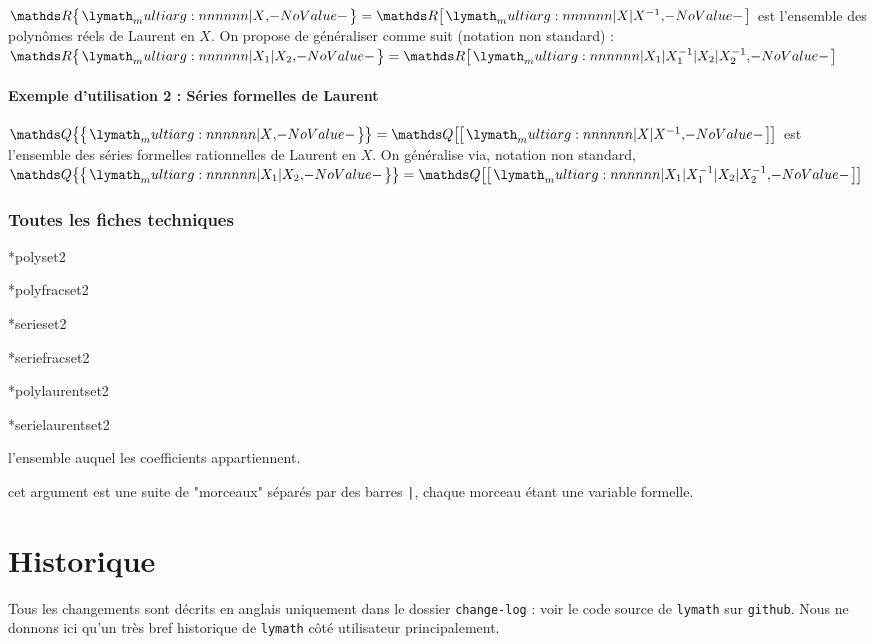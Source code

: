 \documentclass[12pt,a4paper]{article}
\makeatletter
\theoremstyle{definition}
\newcommand\IDmacro{\@ifstar{\@IDmacro@star}{\@IDmacro@no@star}}
\newcommand\@IDmacro@no@star[3]{%
    \texttt{%
    	\textbackslash#1%
    	\IfStrEq{#2}{0}{}{%
    		\,\,[#2 Option%
				\IfStrEq{#2}{1}{}{s}]%
			}%
	    \IfStrEq{#3}{}{}{%
	    		\,\,(#3 Argument%
				\IfStrEq{#3}{1}{}{s})%
			}
	   	}
    \immediate\write\tempfile{macro,#1,#2,#3}%
}
\newcommand\@IDmacro@star[2]{%
    \@IDmacro@no@star{#1}{0}{#2}%
}
\newcommand\@IDoptarg{\@ifstar{\@IDoptarg@star}{\@IDoptarg@no@star}}
\newcommand\@IDoptarg@star[2]{%
	\vspace{0.5em}
	\textbf{---} \texttt{#1%
		\IfStrEq{#2}{}{:}{\,#2:}%
	}%
}
\newcommand\@IDoptarg@no@star[2]{%
	\IfStrEq{#2}{}{%
		\@IDoptarg@star{#1}{}%
	}{%
		\@IDoptarg@star{#1}{#2}%
	}%
}
\newcommand\IDarg[1]{%
	\@IDoptarg{Argument}{#1}%
}
\makeatother
\begin{document}
\begin{tcblisting}{}
$\polylaurentset{\RR}{X} = \polyset{\RR}{X | X^{-1}}$ est l'ensemble des polynômes
réels de Laurent en $X$. On propose de généraliser comme suit (notation non standard) :
$\polylaurentset{\RR}{X_1 | X_2} = \polyset{\RR}{X_1 | X_1^{-1} | X_2 | X_2^{-1}}$
\end{tcblisting}



            \paragraph{Exemple d'utilisation 2 : Séries formelles de Laurent}

\begin{tcblisting}{}
$\serielaurentset{\QQ}{X} = \serieset{\QQ}{X | X^{-1}}$ est l'ensemble des séries 
formelles rationnelles de Laurent en $X$. On généralise via, notation non standard,
$\serielaurentset{\QQ}{X_1 | X_2} = \serieset{\QQ}{X_1 | X_1^{-1} | X_2 | X_2^{-1}}$
\end{tcblisting}



        \subsubsection{Toutes les fiches techniques}

\IDmacro*{polyset}{2}

\IDmacro*{polyfracset}{2}

\IDmacro*{serieset}{2}

\IDmacro*{seriefracset}{2}

\IDmacro*{polylaurentset}{2}

\IDmacro*{serielaurentset}{2}

\IDarg{1} l'ensemble auquel les coefficients appartiennent.

\IDarg{2} cet argument est une suite de "morceaux" séparés par des barres \verb+|+, chaque morceau étant une variable formelle.




\newpage

\section{Historique}

Tous les changements sont décrits en anglais uniquement dans le dossier \verb+change-log+ : voir le code source de \verb+lymath+ sur \verb+github+. Nous ne donnons ici qu'un très bref historique de \verb+lymath+ côté utilisateur principalement.
\end{document}
